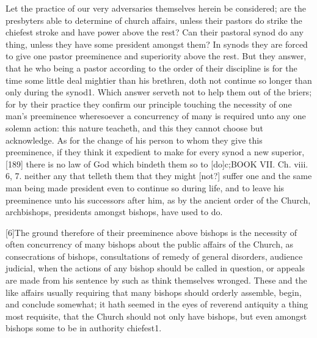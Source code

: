 Let the practice of our very adversaries themselves herein be considered; are the presbyters able to determine of church affairs, unless their pastors do strike the chiefest stroke and have power above the rest? Can their pastoral synod do any thing, unless they have some president amongst them? In synods they are forced to give one pastor preeminence and superiority above the rest. But they answer, that he who being a pastor according to the order of their discipline is for the time some little deal mightier than his brethren, doth not continue so longer than only during the synod1. Which answer serveth not to help them out of the briers; for by their practice they confirm our principle touching the necessity of one man’s preeminence wheresoever a concurrency of many is required unto any one solemn action: this nature teacheth, and this they cannot choose but acknowledge. As for the change of his person to whom they give this preeminence, if they think it expedient to make for every synod a new superior, [189] there is no law of God which bindeth them so to [do]c;BOOK VII. Ch. viii. 6, 7. neither any that telleth them that they might [not?] suffer one and the same man being made president even to continue so during life, and to leave his preeminence unto his successors after him, as by the ancient order of the Church, archbishops, presidents amongst bishops, have used to do.

[6]The ground therefore of their preeminence above bishops is the necessity of often concurrency of many bishops about the public affairs of the Church, as consecrations of bishops, consultations of remedy of general disorders, audience judicial, when the actions of any bishop should be called in question, or appeals are made from his sentence by such as think themselves wronged. These and the like affairs usually requiring that many bishops should orderly assemble, begin, and conclude somewhat; it hath seemed in the eyes of reverend antiquity a thing most requisite, that the Church should not only have bishops, but even amongst bishops some to be in authority chiefest1.

